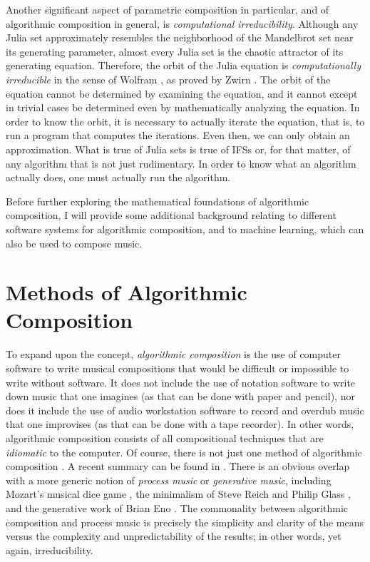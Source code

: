 \documentclass[11pt]{scrartcl}
\begin{document}
Another significant aspect of parametric composition in particular, and of algorithmic composition in general, is \emph{computational irreducibility}. Although any Julia set approximately resembles the neighborhood of the Mandelbrot set near its generating parameter, almost every Julia set is the chaotic attractor of its generating equation. Therefore, the orbit of the Julia equation is \emph{computationally irreducible} in the sense of Wolfram \parencite{wolfram1985undecidability}, as proved by Zwirn \parencite{zwirn2015computational}. The orbit of the equation cannot be determined by examining the equation, and it cannot except in trivial cases be determined even by mathematically analyzing the equation. In order to know the orbit, it is necessary to actually iterate the equation, that is, to run a program that computes the iterations. Even then, we can only obtain an approximation. What is true of Julia sets is true of IFSs or, for that matter, of any algorithm that is not just rudimentary. In order to know what an algorithm actually does, one must actually run the algorithm.

Before further exploring the mathematical foundations of algorithmic composition, I will provide some additional background relating to different software systems for algorithmic composition, and to machine learning, which can also be used to compose music.

\section*{Methods of Algorithmic Composition}

To expand upon the concept, \emph{algorithmic composition} is the use of computer software to write musical compositions that would be difficult or impossible to write without software. It does not include the use of notation software to write down music that one imagines (as that can be done with paper and pencil), nor does it include the use of audio workstation software to record and overdub music that one improvises (as that can be done with a tape recorder). In other words, algorithmic composition consists of all compositional techniques that are \emph{idiomatic }to the computer. Of course, there is not just one method of algorithmic composition \parencite{fernandez2013ai, arizanet}. A recent summary can be found in \parencite{mclean2018oxford}. There is an obvious overlap with a more generic notion of \emph{process music} or \emph{generative music}, including Mozart's musical dice game \parencite{humdrumdice}, the minimalism of Steve Reich \parencite{reichprocess, 10.2307/832600} and Philip Glass \parencite{potter2002four, glass2015words}, and the generative work of Brian Eno \parencite{eno1996generative}. The commonality between algorithmic composition and process music is precisely the simplicity and clarity of the means versus the complexity and unpredictability of the results; in other words, yet again, irreducibility. 
\end{document}
